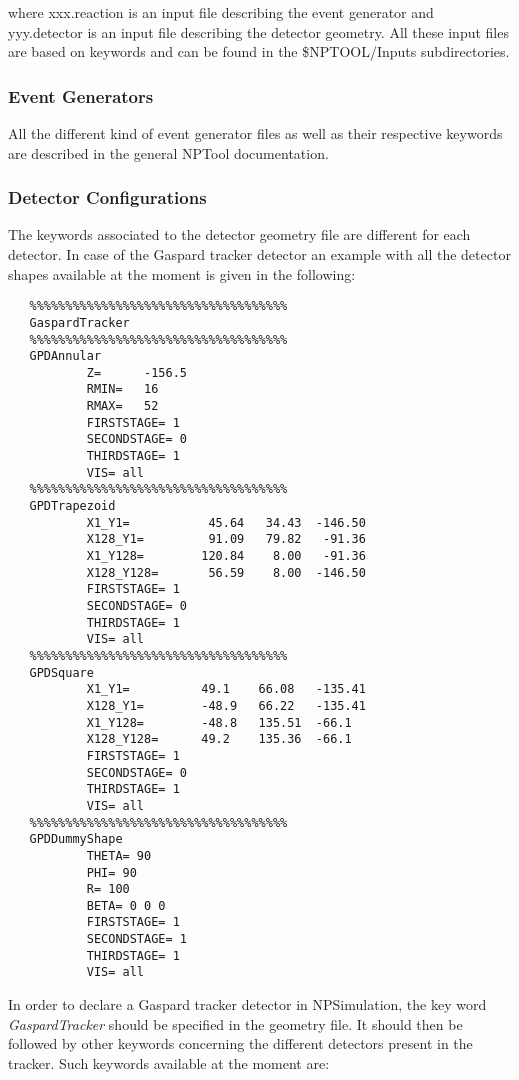 \documentclass[a4paper,12pt]{article}
\begin{document}
where xxx.reaction is an input file describing the event generator and
yyy.detector is an input file describing the detector geometry. All these
input files are based on keywords and can be found in the \$NPTOOL/Inputs 
subdirectories.

\subsubsection{Event Generators}
All the different kind of event generator files as well as their 
respective keywords are described in the general NPTool documentation. 

\subsubsection{Detector Configurations}
The keywords associated to the detector geometry file are different for 
each detector. In case of the Gaspard tracker detector an example with 
all the detector shapes available at the moment is given in the following:

\begin{verbatim}
   %%%%%%%%%%%%%%%%%%%%%%%%%%%%%%%%%%%%
   GaspardTracker
   %%%%%%%%%%%%%%%%%%%%%%%%%%%%%%%%%%%%
   GPDAnnular
           Z=      -156.5
           RMIN=   16
           RMAX=   52
           FIRSTSTAGE= 1
           SECONDSTAGE= 0
           THIRDSTAGE= 1
           VIS= all
   %%%%%%%%%%%%%%%%%%%%%%%%%%%%%%%%%%%%
   GPDTrapezoid
           X1_Y1=           45.64   34.43  -146.50
           X128_Y1=         91.09   79.82   -91.36
           X1_Y128=        120.84    8.00   -91.36
           X128_Y128=       56.59    8.00  -146.50
           FIRSTSTAGE= 1
           SECONDSTAGE= 0
           THIRDSTAGE= 1
           VIS= all
   %%%%%%%%%%%%%%%%%%%%%%%%%%%%%%%%%%%%
   GPDSquare
           X1_Y1=          49.1    66.08   -135.41
           X128_Y1=        -48.9   66.22   -135.41
           X1_Y128=        -48.8   135.51  -66.1
           X128_Y128=      49.2    135.36  -66.1
           FIRSTSTAGE= 1
           SECONDSTAGE= 0
           THIRDSTAGE= 1
           VIS= all
   %%%%%%%%%%%%%%%%%%%%%%%%%%%%%%%%%%%%
   GPDDummyShape
           THETA= 90
           PHI= 90
           R= 100
           BETA= 0 0 0
           FIRSTSTAGE= 1
           SECONDSTAGE= 1
           THIRDSTAGE= 1
           VIS= all
\end{verbatim}

In order to declare a Gaspard tracker detector in NPSimulation, the key
word {\it GaspardTracker} should be specified in the geometry file. It
should then be followed by other keywords concerning the different
detectors present in the tracker. Such keywords available at the moment
are:
\end{document}
